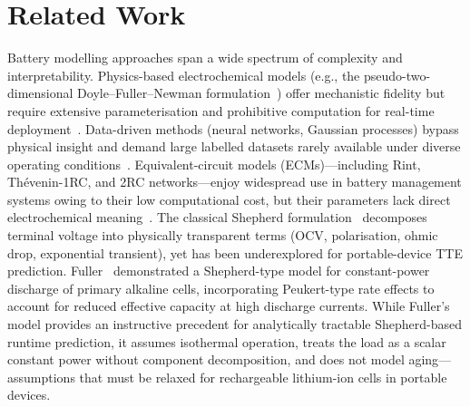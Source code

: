 \documentclass[5p,times,number]{elsarticle}
\begin{document}
\section{Related Work}\label{sec:related}
Battery modelling approaches span a wide spectrum of complexity and interpretability.
Physics-based electrochemical models (e.g., the pseudo-two-dimensional Doyle--Fuller--Newman formulation~\cite{Doyle1993,Newman2004}) offer mechanistic fidelity but require extensive parameterisation and prohibitive computation for real-time deployment~\cite{Mama2025}.
Data-driven methods (neural networks, Gaussian processes) bypass physical insight and demand large labelled datasets rarely available under diverse operating conditions~\cite{Chemali2018,Richardson2017,Xu2012ECM,Lipu2021}.
Equivalent-circuit models (ECMs)---including Rint, Th\'{e}venin-1RC, and 2RC networks---enjoy widespread use in battery management systems owing to their low computational cost, but their parameters lack direct electrochemical meaning~\cite{Hu2012,You2018,He2012ECM,Birkl2015}.
The classical Shepherd formulation~\cite{Shepherd1965} decomposes terminal voltage into physically transparent terms (OCV, polarisation, ohmic drop, exponential transient), yet has been underexplored for portable-device TTE prediction.
Fuller~\cite{Fuller2014} demonstrated a Shepherd-type model for constant-power discharge of primary alkaline cells, incorporating Peukert-type rate effects to account for reduced effective capacity at high discharge currents.
While Fuller's model provides an instructive precedent for analytically tractable Shepherd-based runtime prediction, it assumes isothermal operation, treats the load as a scalar constant power without component decomposition, and does not model aging---assumptions that must be relaxed for rechargeable lithium-ion cells in portable devices.
\end{document}
